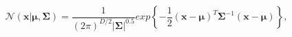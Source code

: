 \begin{equation}
\label{eq:multivariategaussiandistribution}
\mathcal{N}(\mathbf{x} | \boldsymbol{\mu}, \mathbf{\Sigma}) = 
\frac{1}{(2 \pi)^{D/2} |\boldsymbol\Sigma|^{0.5}} 
exp \left\{ - \frac{1}{2} (\mathbf{x} - \boldsymbol{\mu})^T 
\boldsymbol\Sigma^{-1}  (\mathbf{x} - \boldsymbol{\mu})
\right\} ,
\end{equation}
